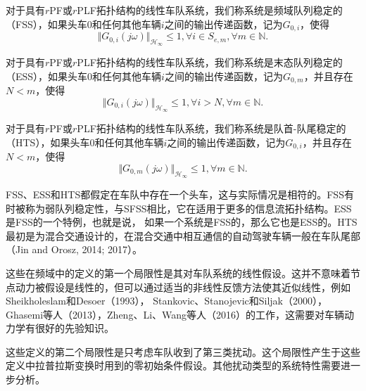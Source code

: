 \begin{translation}
\begin{definition}[FSS]
  对于具有$r$PF或$r$PLF拓扑结构的线性车队系统，我们称系统是频域队列稳定的（FSS），如果头车$0$和任何其他车辆$i$之间的输出传递函数，记为$G_{0, i}$，使得
  \begin{equation}
    \Vert G_{0,i}(j\omega) \Vert_{\mathcal{H}_\infty} \leqslant 1, \forall i \in S_{e, m}, \forall m \in \mathbb{N}.
    \label{eq:appendix-equation-9}
  \end{equation}
  \label{def:appendix-translation-def3}
\end{definition}

\begin{definition}[ESS]
  对于具有$r$PF或$r$PLF拓扑结构的线性车队系统，我们称系统是末态队列稳定的（ESS），如果头车$0$和任何其他车辆$i$之间的输出传递函数，记为$G_{0, m}$，并且存在$N < m$，使得
  \begin{equation}
    \Vert G_{0,i}(j\omega) \Vert_{\mathcal{H}_\infty} \leqslant 1, \forall i > N, \forall m \in \mathbb{N}.
    \label{eq:appendix-equation-10}
  \end{equation}
  \label{def:appendix-translation-def4}
\end{definition}

\begin{definition}[HTS]
  对于具有$r$PF或$r$PLF拓扑结构的线性车队系统，我们称系统是队首-队尾稳定的（HTS），如果头车$0$和任何其他车辆$i$之间的输出传递函数，记为$G_{0, i}$，并且存在$N < m$，使得
  \begin{equation}
    \Vert G_{0,m}(j\omega) \Vert_{\mathcal{H}_\infty} \leqslant 1, \forall m \in \mathbb{N}.
    \label{eq:appendix-equation-11}
  \end{equation}
  \label{def:appendix-translation-def5}
\end{definition}

FSS、ESS和HTS都假定在车队中存在一个头车，这与实际情况是相符的。FSS有时被称为弱队列稳定性，与SFSS相比，它在适用于更多的信息流拓扑结构。ESS是FSS的一个特例，也就是说，
如果一个系统是FSS的，那么它也是ESS的。HTS最初是为混合交通设计的，在混合交通中相互通信的自动驾驶车辆一般在车队尾部（Jin and Orosz, 2014; 2017）。

这些在频域中的定义的第一个局限性是其对车队系统的线性假设。这并不意味着节点动力被假设是线性的，但可以通过适当的非线性反馈方法使其近似线性，例如Sheikholeslam和Desoer（1993），
Stankovic、Stanojevic和Siljak（2000），Ghasemi等人（2013），Zheng、Li、Wang等人（2016）的工作，这需要对车辆动力学有很好的先验知识。

这些定义的第二个局限性是只考虑车队收到了第三类扰动。这个局限性产生于这些定义中拉普拉斯变换时用到的零初始条件假设。其他扰动类型的系统特性需要进一步分析。


\end{translation}
